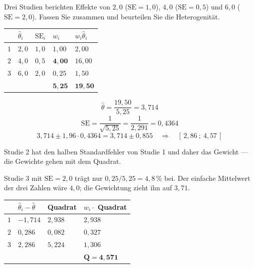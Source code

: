 \begin{aufgabe}
Drei Studien berichten Effekte von $2{,}0$ ($\mathrm{SE} = 1{,}0$), $4{,}0$ ($\mathrm{SE} = 0{,}5$) und $6{,}0$ ($\mathrm{SE} = 2{,}0$). Fassen Sie zusammen und beurteilen Sie die Heterogenität.

\loesung
{}
\begin{center}
\renewcommand{\arraystretch}{1.4}
\begin{tabular}{@{}P{1.4cm}P{1.4cm}P{1.4cm}P{1.6cm}P{1.6cm}@{}}
\toprule
& $\hat\theta_i$ & $\mathrm{SE}_i$ & $w_i$ & $w_i\hat\theta_i$\\
\midrule
$1$ & $2{,}0$ & $1{,}0$ & $1{,}00$ & $2{,}00$\\
$2$ & $4{,}0$ & $0{,}5$ & $\mathbf{4{,}00}$ & $16{,}00$\\
$3$ & $6{,}0$ & $2{,}0$ & $0{,}25$ & $1{,}50$\\
\midrule
& & & $\mathbf{5{,}25}$ & $\mathbf{19{,}50}$\\
\bottomrule
\end{tabular}
\end{center}

\[ \hat\theta = \frac{19{,}50}{5{,}25} = 3{,}714 \]
\[ \mathrm{SE} = \frac{1}{\sqrt{5{,}25}} = \frac{1}{2{,}291} = 0{,}4364 \]
\[ 3{,}714 \pm 1{,}96 \cdot 0{,}4364 = 3{,}714 \pm 0{,}855 \quad\Longrightarrow\quad [\,2{,}86\ ;\ 4{,}57\,] \]

Studie 2 hat den halben Standardfehler von Studie 1 und daher das  Gewicht --- die Gewichte gehen mit dem Quadrat.

Studie 3 mit $\mathrm{SE} = 2{,}0$ trägt nur $0{,}25/5{,}25 = 4{,}8\,\%$ bei. Der einfache Mittelwert der drei Zahlen wäre $4{,}0$; die Gewichtung zieht ihn auf $3{,}71$.

\begin{center}
\renewcommand{\arraystretch}{1.4}
\begin{tabular}{@{}P{1.4cm}P{1.8cm}P{1.8cm}P{2.0cm}@{}}
\toprule
& $\hat\theta_i - \hat\theta$ & \textbf{Quadrat} & $w_i \cdot$ Quadrat\\
\midrule
$1$ & $-1{,}714$ & $2{,}938$ & $2{,}938$\\
$2$ & $0{,}286$ & $0{,}082$ & $0{,}327$\\
$3$ & $2{,}286$ & $5{,}224$ & $1{,}306$\\
\midrule
& & & $\mathbf{Q = 4{,}571}$\\
\bottomrule
\end{tabular}
\end{center}


\end{aufgabe}
